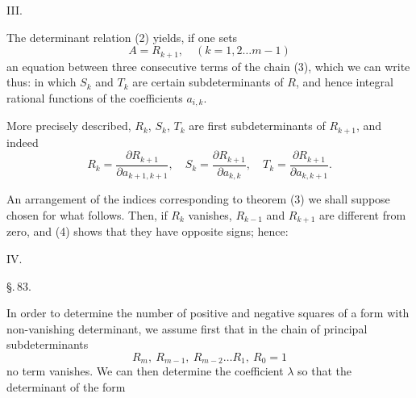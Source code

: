 
III.\ 

The determinant relation (2) yields, if one sets
\[
A = R_{k+1}, \quad (k = 1, 2 \ldots m-1)
\]
an equation between three consecutive terms of the chain (3), which we can write thus:
in which $S_k$ and $T_k$ are certain subdeterminants of $R$, and hence integral rational functions of the coefficients $a_{i,k}$.

More precisely described, $R_k$, $S_k$, $T_k$ are first subdeterminants of $R_{k+1}$, and indeed
\[
R_k = \frac{\partial R_{k+1}}{\partial a_{k+1,k+1}}, \quad S_k = \frac{\partial R_{k+1}}{\partial a_{k,k}}, \quad T_k = \frac{\partial R_{k+1}}{\partial a_{k,k+1}}.
\]

An arrangement of the indices corresponding to theorem (3) we shall suppose chosen for what follows. Then, if $R_k$ vanishes, $R_{k-1}$ and $R_{k+1}$ are different from zero, and (4) shows that they have opposite signs; hence:

IV.\ 

\begin{center}
\S.\,83.\\[4pt]
\end{center}

In order to determine the number of positive and negative squares of a form with non-vanishing determinant, we assume first that in the chain of principal subdeterminants
\[
R_m,\ R_{m-1},\ R_{m-2} \ldots R_1,\ R_0 = 1
\]
no term vanishes. We can then determine the coefficient $\lambda$ so that the determinant of the form
